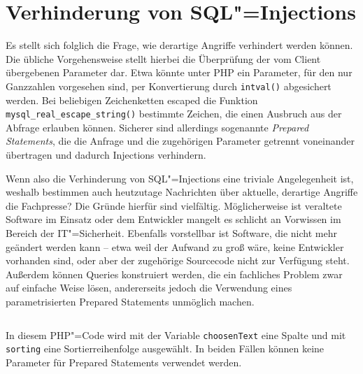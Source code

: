 \section{Verhinderung von SQL"=Injections}

Es stellt sich folglich die Frage, wie derartige Angriffe verhindert werden können. Die übliche Vorgehensweise stellt hierbei die Überprüfung der vom Client übergebenen Parameter dar. Etwa könnte unter PHP ein Parameter, für den nur Ganzzahlen vorgesehen sind, per Konvertierung durch \texttt{intval()} abgesichert werden. Bei beliebigen Zeichenketten escaped die Funktion \texttt{mysql_real_escape_string()} bestimmte Zeichen, die einen Ausbruch aus der Abfrage erlauben können. Sicherer sind allerdings sogenannte \emph{Prepared Statements}, die die Anfrage und die zugehörigen Parameter getrennt voneinander übertragen und dadurch Injections verhindern.

Wenn also die Verhinderung von SQL"=Injections eine triviale Angelegenheit ist, weshalb bestimmen auch heutzutage Nachrichten über aktuelle, derartige Angriffe die Fachpresse? Die Gründe hierfür sind vielfältig. Möglicherweise ist veraltete Software im Einsatz oder dem Entwickler mangelt es schlicht an Vorwissen im Bereich der IT"=Sicherheit.  Ebenfalls vorstellbar ist Software, die nicht mehr geändert werden kann -- etwa weil der Aufwand zu groß wäre, keine Entwickler vorhanden sind, oder aber der zugehörige Sourcecode nicht zur Verfügung steht. Außerdem können Queries konstruiert werden, die ein fachliches Problem zwar auf einfache Weise lösen, andererseits jedoch die Verwendung eines parametrisierten Prepared Statements unmöglich machen.

\begin{listing}[htbp!]
\begin{margincap}
\inputminted[startinline,obeytabs]{php}{imports/weak_features.php}
\caption[asd]{In diesem PHP"=Code wird mit der Variable \texttt{choosenText} eine Spalte und mit \texttt{sorting} eine Sortierreihenfolge ausgewählt. In beiden Fällen können keine Parameter für Prepared Statements verwendet werden.}
\label{lst:strange_query}
\end{margincap}
\end{listing}



